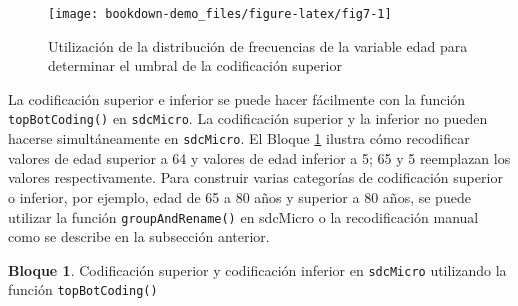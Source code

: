 \documentclass[
]{book}
\newenvironment{Shaded}{\begin{snugshade}}{\end{snugshade}}
\newcommand{\AttributeTok}[1]{\textcolor[rgb]{0.77,0.63,0.00}{#1}}
\newcommand{\CommentTok}[1]{\textcolor[rgb]{0.56,0.35,0.01}{\textit{#1}}}
\newcommand{\DecValTok}[1]{\textcolor[rgb]{0.00,0.00,0.81}{#1}}
\newcommand{\FunctionTok}[1]{\textcolor[rgb]{0.00,0.00,0.00}{#1}}
\newcommand{\NormalTok}[1]{#1}
\newcommand{\OtherTok}[1]{\textcolor[rgb]{0.56,0.35,0.01}{#1}}
\newcommand{\StringTok}[1]{\textcolor[rgb]{0.31,0.60,0.02}{#1}}
\theoremstyle{definition}
\theoremstyle{definition}
\newtheorem{example}{Bloque}[chapter]
\theoremstyle{definition}
\theoremstyle{definition}
\theoremstyle{remark}
\begin{document}
\begin{figure}
\texttt{[image: bookdown-demo\_files/figure-latex/fig7-1]} \caption{Utilización de la distribución de frecuencias de la variable edad para determinar el umbral de la codificación superior}\label{fig:fig7}
\end{figure}

La codificación superior e inferior se puede hacer fácilmente con la función \texttt{topBotCoding()} en \texttt{sdcMicro}. La codificación superior y la inferior no pueden hacerse simultáneamente en \texttt{sdcMicro}. El Bloque \ref{exm:bloque20jgm} ilustra cómo recodificar valores de edad superior a 64 y valores de edad inferior a 5; 65 y 5 reemplazan los valores respectivamente. Para construir varias categorías de codificación superior o inferior, por ejemplo, edad de 65 a 80 años y superior a 80 años, se puede utilizar la función \texttt{groupAndRename()} en sdcMicro o la recodificación manual como se describe en la subsección anterior.

\begin{example}
\protect\hypertarget{exm:bloque20jgm}{}\label{exm:bloque20jgm}Codificación superior y codificación inferior en \texttt{sdcMicro} utilizando la función \texttt{topBotCoding()}
\end{example}

\begin{Shaded}
\end{Shaded}
\end{document}
